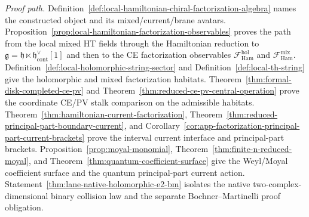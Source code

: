 \begin{stmt}
  \emph{Proof path.}
  Definition~\ref{def:local-hamiltonian-chiral-factorization-algebra}
  names the constructed object and its mixed/current/brane avatars.
  Proposition~\ref{prop:local-hamiltonian-factorization-observables}
  proves the path from the local mixed HT fields through the Hamiltonian
  reduction to
  \(\mathfrak g=\mathfrak h\ltimes
  \mathfrak h^\vee_{\mathrm{cont}}[1]\) and then to the CE
  factorization observables
  \(\mathcal F_{\mathrm{Ham}}^{\mathrm{hol}}\) and
  \(\mathcal F_{\mathrm{Ham}}^{\mathrm{mix}}\).
  Definition~\ref{def:local-holomorphic-string-sector} and
  Definition~\ref{def:local-th-string} give the holomorphic and mixed
  factorization habitats.  Theorem~\ref{thm:formal-disk-completed-ce-pv}
  and Theorem~\ref{thm:reduced-ce-pv-central-operation} prove the
  coordinate CE/PV stalk comparison on the admissible habitats.
  Theorem~\ref{thm:hamiltonian-current-factorization},
  Theorem~\ref{thm:reduced-principal-part-boundary-current}, and
  Corollary~\ref{cor:app-factorization-principal-part-current-brackets}
  prove the interval current interface and principal-part brackets.
  Proposition~\ref{prop:moyal-monomial},
  Theorem~\ref{thm:finite-n-reduced-moyal}, and
  Theorem~\ref{thm:quantum-coefficient-surface} give the Weyl/Moyal
  coefficient surface and the quantum principal-part current action.
  Statement~\ref{thm:lane-native-holomorphic-e2-bm} isolates the native
  two-complex-dimensional binary collision law and the separate
  Bochner--Martinelli proof obligation.


\end{stmt}

